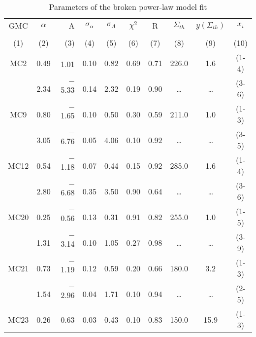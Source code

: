 \documentclass[iop]{emulateapj}
\begin{document}
\begin{table*}[!h!tb]
\begin{center}
\centering 
\caption{Parameters of the broken power-law model fit}
\begin{tabular}{ccrccccccc}
 \hline
\hline
GMC  &$\alpha$&A       & $\sigma_{\alpha}$&$\sigma_A$&$\chi^2$& R   &$\Sigma_{th}$ & $y(\Sigma_{th})$   & $x_i$   \\
           &              &          &                      &                     &              &          &\tiny     &\tiny    &    \\
(1) & (2) & (3) & (4) & (5) & (6) & (7) & (8) & (9) & (10) \\
\hline
MC2  &  0.49   &  $-$1.01   &  0.10        &        0.82      &  0.69      &  0.71    &   226.0      &  1.6             & (1-4)   \\
          &  2.34   &  $-$5.33  &   0.14         &       2.32      &  0.19       &  0.90     &   \ldots      & \ldots          &  (3-6)   \\
MC9  &  0.80   &  $-$1.65  &    0.10       &        0.50       &  0.30      &  0.59     &   211.0     &  1.0             &  (1-3)  \\
          &  3.05   &  $-$6.76  &    0.05       &        4.06      &  0.10        &  0.92     &  \ldots      & \ldots          &  (3-5)  \\
MC12&  0.54   &  $-$1.18  &     0.07      &       0.44       &  0.15        &  0.92     &  285.0     &  1.6             &  (1-4)  \\
          &  2.80   &  $-$6.68  &     0.35      &        3.50      &  0.90        &   0.64   &   \ldots      & \ldots         &  (3-6)   \\
MC20&  0.25   & $-$0.56   &    0.13       &        0.31      &   0.91      &    0.82   &   255.0     & 1.0             &  (1-5) \\
          &  1.31   &  $-$3.14  &    0.10       &        1.05      &   0.27       &   0.98     &   \ldots     &  \ldots        &  (3-9)   \\
MC21&   0.73  &  $-$1.19  &    0.12     &         0.59     &  0.20         &    0.66   &   180.0    & 3.2             &  (1-3)   \\
          &   1.54  &  $-$2.96  &    0.04      &        1.71      &  0.10         &    0.94    &  \ldots     & \ldots         &  (2-5)  \\
MC23&  0.26   &    0.63     &    0.03      &        0.43     &  0.10         &    0.83    &  150.0    &15.9            &  (1-3)  \\

\end{tabular}
\end{center}
\end{table*}
\end{document}
